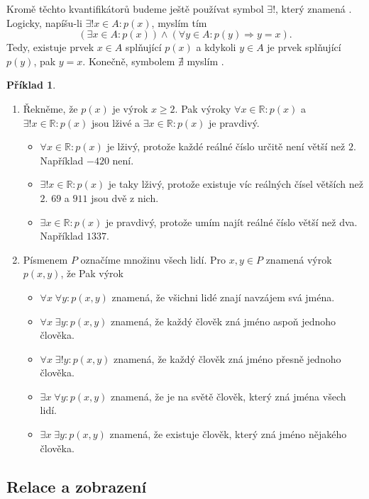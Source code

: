 \documentclass[a4paper,11pt]{article}
\theoremstyle{definition}
\newtheorem{exm}[thm]{Příklad}
\newcommand{\R}{\mathbb{R}}
\begin{document}
Kromě těchto kvantifikátorů budeme ještě používat symbol $ \exists !$, který
znamená . Logicky, napíšu-li $ \exists !x \in A:p(x)$,
myslím tím
\[
 (\exists x \in A:p(x)) \wedge ( \forall y \in A:p(y) \Rightarrow y = x).
\]
Tedy, existuje prvek $x \in A$ splňující $p(x)$ a kdykoli $y \in A$ je prvek
splňující $p(y)$, pak $y = x$. Konečně, symbolem $\nexists$ myslím
.

\begin{exm}\hfill
 \begin{enumerate}
  \item Řekněme, že $p(x)$ je výrok $x \geq 2$. Pak výroky $ \forall x \in
   \R:p(x)$ a $ \exists !x \in \R:p(x)$ jsou lživé a $ \exists x \in \R:p(x)$ je
   pravdivý.
   \begin{itemize}
    \item $ \forall x \in \R:p(x)$ je lživý, protože každé reálné číslo určitě
     není větší než $2$. Například $-420$ není.
    \item $ \exists !x \in \R:p(x)$ je taky lživý, protože existuje víc reálných
     čísel větších než $2$. $69$ a $911$ jsou dvě z nich.
    \item $ \exists x \in \R:p(x)$ je pravdivý, protože umím najít reálné číslo
     větší než dva. Například $1337$.
   \end{itemize}
  \item Písmenem $P$ označíme množinu všech lidí. Pro $x,y \in P$ znamená výrok
   $p(x,y)$, že  Pak výrok
   \begin{itemize}
    \item $ \forall x \; \forall y: p(x,y)$ znamená, že všichni lidé znají
     navzájem svá jména.
    \item $ \forall x \; \exists y: p(x,y)$ znamená, že každý člověk zná jméno
     aspoň jednoho člověka.
    \item $ \forall x \; \exists !y:p(x,y)$ znamená, že každý člověk zná jméno
     přesně jednoho člověka.
    \item $  \exists x \; \forall y :p(x,y)$ znamená, že je na světě člověk,
     který zná jména všech lidí.
    \item $ \exists x \; \exists y: p(x,y)$ znamená, že existuje člověk, který
     zná jméno nějakého člověka.
   \end{itemize}
 \end{enumerate}
\end{exm}

\subsection{Relace a zobrazení}
\label{ssec:relace-a-zobrazeni}
\end{document}

